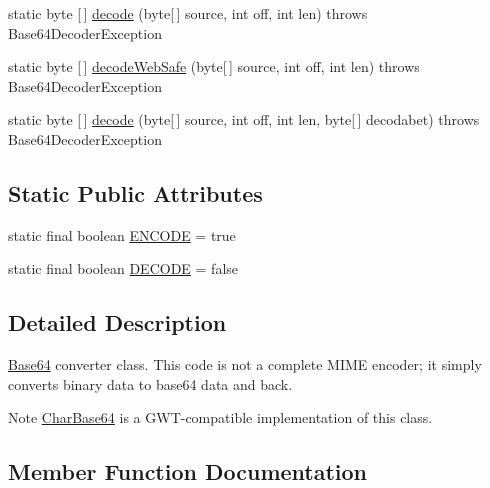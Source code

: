 \begin{DoxyCompactItemize}
\item 
static byte \mbox{[}$\,$\mbox{]} \hyperlink{classorg_1_1cocos2dx_1_1plugin_1_1util_1_1Base64_a7c98b97ad848ef0e656b81020bf51d72}{decode} (byte\mbox{[}$\,$\mbox{]} source, int off, int len)  throws Base64\+Decoder\+Exception 
\item 
static byte \mbox{[}$\,$\mbox{]} \hyperlink{classorg_1_1cocos2dx_1_1plugin_1_1util_1_1Base64_a8de5b08172c34db233e20982ff553222}{decode\+Web\+Safe} (byte\mbox{[}$\,$\mbox{]} source, int off, int len)  throws Base64\+Decoder\+Exception 
\item 
static byte \mbox{[}$\,$\mbox{]} \hyperlink{classorg_1_1cocos2dx_1_1plugin_1_1util_1_1Base64_a427da971e6fa682edbab8dc17a282342}{decode} (byte\mbox{[}$\,$\mbox{]} source, int off, int len, byte\mbox{[}$\,$\mbox{]} decodabet)  throws Base64\+Decoder\+Exception 
\end{DoxyCompactItemize}
\subsection*{Static Public Attributes}
\begin{DoxyCompactItemize}
\item 
static final boolean \hyperlink{classorg_1_1cocos2dx_1_1plugin_1_1util_1_1Base64_ae470fc5366fc836525ed00c85cff4d47}{E\+N\+C\+O\+DE} = true
\item 
static final boolean \hyperlink{classorg_1_1cocos2dx_1_1plugin_1_1util_1_1Base64_ac34d0f67dded79aa4e9439320e741d45}{D\+E\+C\+O\+DE} = false
\end{DoxyCompactItemize}


\subsection{Detailed Description}
\hyperlink{classorg_1_1cocos2dx_1_1plugin_1_1util_1_1Base64}{Base64} converter class. This code is not a complete M\+I\+ME encoder; it simply converts binary data to base64 data and back.

Note \hyperlink{}{Char\+Base64} is a G\+W\+T-\/compatible implementation of this class. 

\subsection{Member Function Documentation}
\mbox{\label{classorg_1_1cocos2dx_1_1plugin_1_1util_1_1Base64_ad2bac3d895c8b36bb6141dd142c8e77e}} 
